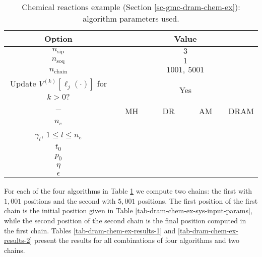 \begin{table}[h!]
\begin{center}
\begin{tabular}{|c|c|c|c|c|}
\hline
Option                                            & \multicolumn{4}{c|}{Value}                                   \\
\hline
\hline
$n_{\text{sip}}$                                  & \multicolumn{4}{c|}{$3$}                                     \\
\hline
$n_{\text{soq}}$                                  & \multicolumn{4}{c|}{$1$}                                     \\
\hline
$n_{\text{chain}}$                                & \multicolumn{4}{c|}{$1001,~5001$}                            \\
\hline
Update $V^{(k)}[\ell_j(\cdot)]$ for $k>0$?        & \multicolumn{4}{c|}{Yes}                                     \\
\hline
\hline
$-$                                               & ~~MH~~            & ~~DR~~       & ~~AM~~       & DRAM       \\
\hline
$n_e$                                             &                   &              &              &            \\
\hline
$\gamma_l$,
$1\leqslant l\leqslant n_e$                       &                   &              &              &            \\
\hline
\hline
$t_0$                                             &                   &              &              &            \\
\hline
$p_0$                                             &                   &              &              &            \\
\hline
$\eta$                                            &                   &              &              &            \\
\hline
$\epsilon$                                        &                   &              &              &            \\
\hline
\end{tabular}
\caption{Chemical reactions example (Section \ref{sc-gmc-dram-chem-ex}):
algorithm parameters used.
}
\label{tab-dram-chem-ex-alg-params}
\end{center}
\end{table}

For each of the four algorithms in Table \ref{tab-dram-chem-ex-alg-params}
we compute two chains: the first with $1,001$ positions and the second with $5,001$ positions.
The first position of the first chain is the initial position given in Table \ref{tab-dram-chem-ex-sys-input-params}, while
the second position of the second chain is the final position computed in the first chain.
Tables \ref{tab-dram-chem-ex-results-1} and \ref{tab-dram-chem-ex-results-2} present the results for all combinations of four
algorithms and two chains.

